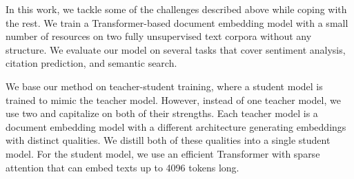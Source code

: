 In this work, we tackle some of the challenges described above while coping
with the rest. We train a Transformer-based document embedding model with a
small number of resources on two fully unsupervised text corpora without any
structure. We evaluate our model on several tasks that cover sentiment
analysis, citation prediction, and semantic search.

We base our method on teacher-student training, where a student model is
trained to mimic the teacher model. However, instead of one teacher model, we
use two and capitalize on both of their strengths. Each teacher model is a
document embedding model with a different architecture generating embeddings
with distinct qualities. We distill both of these qualities into a single
student model. For the student model, we use an efficient Transformer with
sparse attention that can embed texts up to 4096 tokens long.
